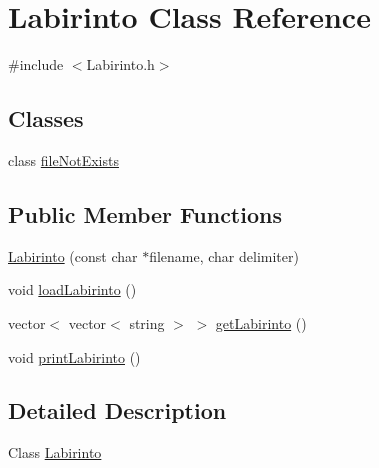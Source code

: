\hypertarget{class_labirinto}{\section{Labirinto Class Reference}
\label{class_labirinto}
}


{\ttfamily \#include $<$Labirinto.\-h$>$}

\subsection*{Classes}
\begin{DoxyCompactItemize}
\item 
class \hyperlink{class_labirinto_1_1file_not_exists}{file\-Not\-Exists}
\end{DoxyCompactItemize}
\subsection*{Public Member Functions}
\begin{DoxyCompactItemize}
\item 
\hyperlink{class_labirinto_a568e4f6fc43fa3f841773cd4015a35d0}{Labirinto} (const char $\ast$filename, char delimiter)
\item 
void \hyperlink{class_labirinto_a4fa06561462c21e865551cd5cc2ef7a9}{load\-Labirinto} ()
\item 
vector$<$ vector$<$ string $>$ $>$ \hyperlink{class_labirinto_a3bf2ebbc998bf73462f1184369b2318b}{get\-Labirinto} ()
\item 
void \hyperlink{class_labirinto_a5fe3ca87b84c71697469238f2d9fe630}{print\-Labirinto} ()
\end{DoxyCompactItemize}


\subsection{Detailed Description}
Class \hyperlink{class_labirinto}{Labirinto} 


